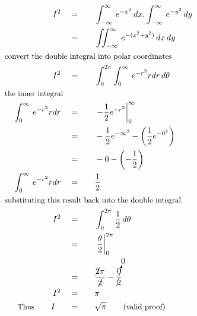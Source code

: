\begin{alignat*}{5}
&\,&I^2\quad&=\quad&&\int_{-\infty}^\infty\,e^{-x^2}\,dx.\int_{-\infty}^\infty\,e^{-y^2}\,dy\\
&\,&\,&=&&\iint_{-\infty}^\infty\,e^{-(x^2+y^2)}\,dx\,dy\\
&\rlap{\small\text{convert the double integral into polar coordinates}}\\
&\,&I^2\quad&=&&\int_0^{2\pi}\int_0^\infty\,e^{-r^2}rdr\,d\theta\\
&\rlap{\small\text{the inner integral}}\\
&\,&\int_0^\infty\,e^{-r^2}rdr\quad&=&&\left.-\frac{1}{2}e^{-r^2}\right\vert_0^\infty\\
&\,&\,&=&&-\frac{1}{2}e^{-\infty^2}-\left(\frac{1}{2}e^{-0^2}\right)\\
&\,&\,&=&&-0-\left(-\frac{1}{2}\right)\\
&\,&\int_0^\infty\,e^{-r^2}rdr\quad&=&&\frac{1}{2}\\
&\rlap{\small\text{substituting this result back into the double integral}}\\
&\,&I^2\quad&=&&\int_0^{2\pi}\,\frac{1}{2}\,d\theta\\
&\,&\,&=&&\left.\frac{\theta}{2}\right\vert_0^{2\pi}\\
&\,&\,&=&&\frac{\cancel{2}\pi}{\cancel{2}}-\cancelto{0}{\frac{0}{2}}\\
&\,&I^2\quad&=&&\pi\\
&\,&\small\text{Thus}\normalsize\qquad I~~\quad&=&&\sqrt{\pi}\qquad\small\text{(valid proof)}
\end{alignat*}
